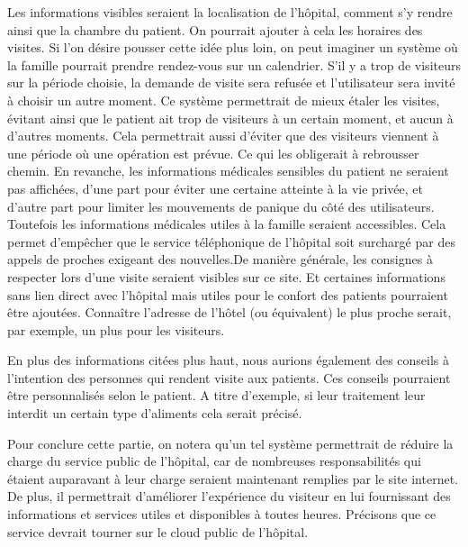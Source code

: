 Les informations visibles seraient la localisation de l'hôpital, comment s'y rendre ainsi que la chambre du patient. On pourrait
ajouter à cela les horaires des visites. Si l'on désire pousser cette idée plus loin, on peut imaginer un système où la famille
pourrait prendre rendez-vous sur un calendrier. S'il y a trop de visiteurs sur la période choisie, la demande de visite sera
refusée et l'utilisateur sera invité à choisir un autre moment. Ce système permettrait de mieux étaler les visites, évitant ainsi
que le patient ait trop de visiteurs à un certain moment, et aucun à d'autres moments. Cela permettrait aussi d'éviter que des
visiteurs viennent à une période où une opération est prévue. Ce qui les obligerait à rebrousser chemin. En revanche, les
informations médicales sensibles du patient ne seraient pas affichées, d'une part pour éviter une certaine atteinte à la vie
privée, et d'autre part pour limiter les mouvements de panique du côté des utilisateurs. Toutefois les informations médicales
utiles à la famille seraient accessibles. Cela permet d'empêcher que le service téléphonique de l'hôpital soit  surchargé par des
appels de proches exigeant des nouvelles.De manière générale, les consignes à respecter lors d'une visite seraient visibles sur
ce site. Et certaines informations sans lien direct avec l'hôpital mais utiles pour le confort des patients pourraient être
ajoutées. Connaître l'adresse de l'hôtel (ou équivalent) le plus proche serait, par exemple, un plus pour les visiteurs.
\newline

En plus des informations citées plus haut, nous aurions également des conseils à l'intention des personnes qui rendent visite aux
patients. Ces conseils pourraient être personnalisés selon le patient. A titre d'exemple, si leur traitement leur interdit un certain type d'aliments
cela serait précisé. 
\newline

Pour conclure cette partie, on notera qu'un tel système permettrait de réduire la charge du service public de l'hôpital, car de
nombreuses responsabilités qui étaient auparavant à leur charge seraient maintenant remplies par le site internet. De plus, il permettrait
d'améliorer l'expérience du visiteur en lui fournissant des informations et services utiles et disponibles à toutes heures.
Précisons que ce service devrait tourner sur le cloud public de l'hôpital.
\newline


